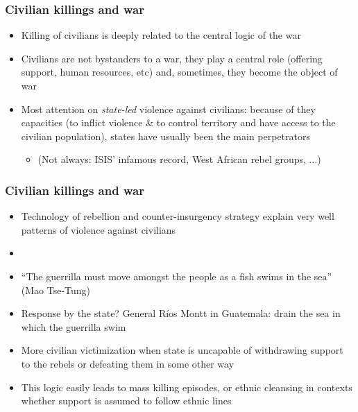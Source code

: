 \documentclass[utf8, xcolor=dvipsnames, handout]{beamer}
\begin{document}
\begin{frame}
\frametitle{Civilian killings and war}
\centering

\begin{itemize}
  \item<1-> Killing of civilians is deeply related to the central logic of the war
  \item<2-> Civilians are not bystanders to a war, they play a central role (offering support, human resources, etc) and, sometimes, they become the object of war
  \item<3-> Most attention on \textit{state-led} violence against civilians: because of they capacities (to inflict violence \& to control territory and have access to the civilian population), states have usually been the main perpetrators
  \begin{itemize}
    \item[] (Not always: ISIS' infamous record, West African rebel groups, ...)
  \end{itemize}
\end{itemize}

\end{frame}

\begin{frame}
\frametitle{Civilian killings and war}
\centering

\begin{itemize}
  \item<1-> Technology of rebellion and counter-insurgency strategy explain very well patterns of violence against civilians
  \item[]
  \item<2-> ``The guerrilla must move amongst the people as a fish swims in the sea'' (Mao Tse-Tung)
  \item<3-> Response by the state? General Ríos Montt in Guatemala: drain the sea in which the guerrilla swim
  \item<4-> More civilian victimization when state is uncapable of withdrawing support to the rebels or defeating them in some other way
  \item<4-> This logic easily leads to mass killing episodes, or ethnic cleansing in contexts whether support is assumed to follow ethnic lines
\end{itemize}

\end{frame}
\end{document}
